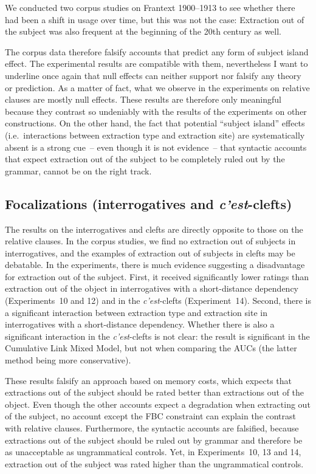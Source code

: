 We conducted two corpus studies on Frantext 1900--1913 to see whether there had been a shift in usage over time, but this was not the case: Extraction out of the subject was also frequent at the beginning of the 20th century as well.

The corpus data therefore falsify accounts that predict any form of subject island effect. The experimental results are compatible with them, nevertheless I want to underline once again that null effects can neither support nor falsify any theory or prediction. As a matter of fact, what we observe in the experiments on relative clauses are mostly null effects. These results are therefore only meaningful because they contrast so undeniably with the results of the experiments on other constructions. On the other hand, the fact that potential ``subject island'' effects (i.e.\ interactions between extraction type and extraction site) are systematically absent is a strong cue~-- even though it is not evidence~-- that syntactic accounts that expect extraction out of the subject to be completely ruled out by the grammar, cannot be on the right track. 

\subsection{Focalizations (interrogatives and \emph{c'est}-clefts)}

The results on the interrogatives and clefts are directly opposite to those on the relative clauses. In the corpus studies, we find no extraction out of subjects in interrogatives, and the examples of extraction out of subjects in clefts may be debatable. In the experiments, there is much evidence suggesting a disadvantage for extraction out of the subject. First, it received significantly lower ratings than extraction out of the object in interrogatives with a short-distance dependency (Experiments~10 and 12) and in the \emph{c'est}-clefts (Experiment~14). Second, there is a significant interaction between extraction type and extraction site in interrogatives with a short-distance dependency. Whether there is also a significant interaction in the \emph{c'est}-clefts is not clear: the result is significant in the Cumulative Link Mixed Model, but not when comparing the AUCs (the latter method being more conservative). 

These results falsify an approach based on memory costs, which expects that extractions out of the subject should be rated better than extractions out of the object. Even though the other accounts expect a degradation when extracting out of the subject, no account except the FBC constraint can explain the contrast with relative clauses. Furthermore, the syntactic accounts are falsified, because extractions out of the subject should be ruled out by grammar and therefore be as unacceptable as ungrammatical controls. Yet, in Experiments~10, 13 and 14, extraction out of the subject was rated higher than the ungrammatical controls.

